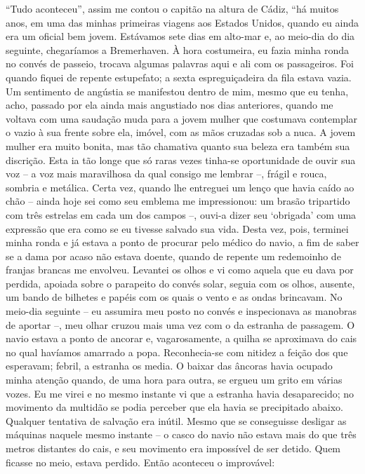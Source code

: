 ``Tudo aconteceu'', assim me contou o capitão na altura de Cádiz, ``há
muitos anos, em uma das minhas primeiras viagens aos Estados Unidos,
quando eu ainda era um oficial bem jovem. Estávamos sete dias em
alto-mar e, ao meio-dia do dia seguinte, chegaríamos a Bremerhaven. À
hora costumeira, eu fazia minha ronda no convés de passeio, trocava
algumas palavras aqui e ali com os passageiros. Foi quando fiquei de
repente estupefato; a sexta espreguiçadeira da fila estava vazia. Um
sentimento de angústia se manifestou dentro de mim, mesmo que eu tenha,
acho, passado por ela ainda mais angustiado nos dias anteriores, quando
me voltava com uma saudação muda para a jovem mulher que costumava
contemplar o vazio à sua frente sobre ela, imóvel, com as mãos cruzadas
sob a nuca. A jovem mulher era muito bonita, mas tão chamativa quanto
sua beleza era também sua discrição. Esta ia tão longe que só raras
vezes tinha-se oportunidade de ouvir sua voz -- a voz mais maravilhosa
da qual consigo me lembrar --, frágil e rouca, sombria e metálica. Certa
vez, quando lhe entreguei um lenço que havia caído ao chão -- ainda hoje
sei como seu emblema me impressionou: um brasão tripartido com três
estrelas em cada um dos campos --, ouvi-a dizer seu `obrigada' com uma
expressão que era como se eu tivesse salvado sua vida. Desta vez, pois,
terminei minha ronda e já estava a ponto de procurar pelo médico do
navio, a fim de saber se a dama por acaso não estava doente, quando de
repente um redemoinho de franjas brancas me envolveu. Levantei os olhos
e vi como aquela que eu dava por perdida, apoiada sobre o parapeito do
convés solar, seguia com os olhos, ausente, um bando de bilhetes e
papéis com os quais o vento e as ondas brincavam. No meio-dia seguinte
-- eu assumira meu posto no convés e inspecionava as manobras de aportar
--, meu olhar cruzou mais uma vez com o da estranha de passagem. O navio
estava a ponto de ancorar e, vagarosamente, a quilha se aproximava do
cais no qual havíamos amarrado a popa. Reconhecia-se com nitidez a
feição dos que esperavam; febril, a estranha os media. O baixar das
âncoras havia ocupado minha atenção quando, de uma hora para outra, se
ergueu um grito em várias vozes. Eu me virei e no mesmo instante vi que
a estranha havia desaparecido; no movimento da multidão se podia
perceber que ela havia se precipitado abaixo. Qualquer tentativa de
salvação era inútil. Mesmo que se conseguisse desligar as máquinas
naquele mesmo instante -- o casco do navio não estava mais do que três
metros distantes do cais, e seu movimento era impossível de ser detido.
Quem ficasse no meio, estava perdido. Então aconteceu o improvável:
